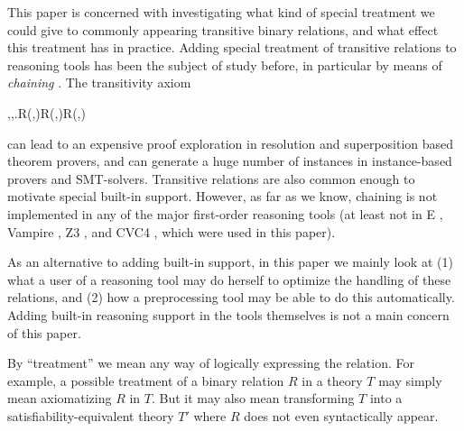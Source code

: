 \documentclass{article}
\newcommand{\Conid}[1]{\mathit{#1}}
\newcommand{\Varid}[1]{\mathit{#1}}
\def\resethooks{%
  \global\let\SaveRestoreHook\empty
  \global\let\ColumnHook\empty}
\let\hspre\empty
\let\hspost\empty
\begin{document}
This paper is concerned with investigating what kind of special treatment we could give to commonly appearing transitive binary relations, and what effect this treatment has in practice. Adding special treatment of transitive relations to reasoning tools has been the subject of study before, in particular by means of {\em chaining} \cite{chaining}. The transitivity axiom
\begin{hscode}\SaveRestoreHook
\column{B}{@{}>{\hspre}l<{\hspost}@{}}%
\column{E}{@{}>{\hspre}l<{\hspost}@{}}%
\>[B]{}\forall{}\hspace{-0.1cm}\;\Varid{x},\Varid{y},\Varid{z}.\;R\hspace{-0.1cm}\;(\Varid{x},\Varid{y})\mathrel{\wedge}R\hspace{-0.1cm}\;(\Varid{y},\Varid{z})\Rightarrow R\hspace{-0.1cm}\;(\Varid{x},\Varid{z}){}\<[E]%
\ColumnHook
\end{hscode}\resethooks
can lead to an expensive proof exploration in resolution and superposition based theorem provers, and can generate a huge number of instances in instance-based provers and SMT-solvers. Transitive relations are also common enough to motivate special built-in support. However, as far as we know, chaining is not implemented in any of the major first-order reasoning tools (at least not in E \cite{E}, Vampire \cite{Vampire}, Z3 \cite{Z3}, and CVC4 \cite{CVC4}, which were used in this paper).

As an alternative to adding built-in support, in this paper we mainly look at (1) what a user of a reasoning tool may do herself to optimize the handling of these relations, and (2) how a preprocessing tool may be able to do this automatically. Adding built-in reasoning support in the tools themselves is not a main concern of this paper.

By ``treatment'' we mean any way of logically expressing the relation. For example, a possible treatment of a binary relation \ensuremath{R} in a theory \ensuremath{\Conid{T}} may simply mean axiomatizing \ensuremath{R} in \ensuremath{\Conid{T}}. But it may also mean transforming \ensuremath{\Conid{T}} into a satisfiability-equivalent theory \ensuremath{\Conid{T'}} where \ensuremath{R} does not even syntactically appear.
\end{document}

